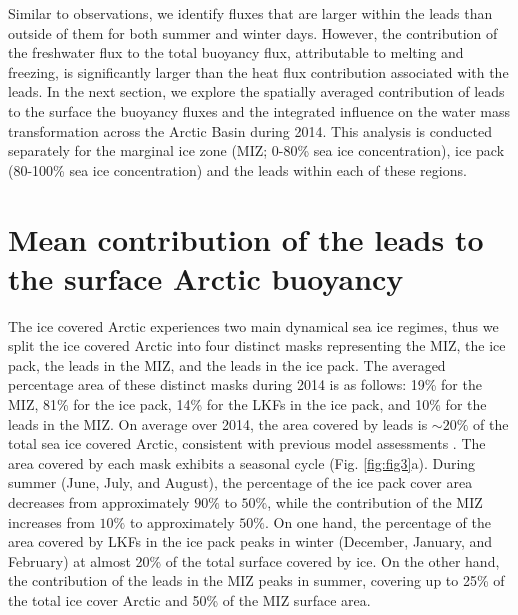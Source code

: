 \documentclass[lineno,sn-basic]{sn-jnl}%
\begin{document}
Similar to observations, we identify fluxes that are larger within the leads than outside of them for both summer and winter days. However, the contribution of the freshwater flux to the total buoyancy flux, attributable to melting and freezing, is significantly larger than the heat flux contribution associated with the leads. In the next section, we explore the spatially averaged contribution of leads to the surface the buoyancy fluxes and the integrated influence on the water mass transformation across the Arctic Basin during 2014. This analysis is conducted separately for the marginal ice zone (MIZ; 0-80\% sea ice concentration), ice pack (80-100\% sea ice concentration) and the leads within each of these regions. 


\section{Mean contribution of the leads to the surface Arctic buoyancy}\label{sec3}

The ice covered Arctic experiences two main dynamical sea ice regimes, thus we split the ice covered Arctic into four distinct masks representing the MIZ, the ice pack, the leads in the MIZ, and the leads in the ice pack. The averaged percentage area of these distinct masks during 2014 is as follows: 19\% for the MIZ, 81\% for the ice pack, 14\% for the LKFs in the ice pack, and 10\% for the leads in the MIZ. On average over 2014, the area covered by leads is $\sim 20\%$ of the total sea ice covered Arctic, consistent with previous model assessments \citep{Wang_leads_2016}. 
The area covered by each mask exhibits a seasonal cycle (Fig. \ref{fig:fig3}a). During summer (June, July, and August), the percentage of the ice pack cover area decreases from approximately $90\%$ to $50\%$, while the contribution of the MIZ increases from $10\%$ to approximately $50\%$. 
On one hand, the percentage of the area covered by LKFs in the ice pack peaks in winter (December, January, and February) at almost 20\% of the total surface covered by ice. On the other hand, the contribution of the leads in the MIZ peaks in summer, covering up to 25\% of the total ice cover Arctic and 50\% of the MIZ surface area. 
\end{document}
